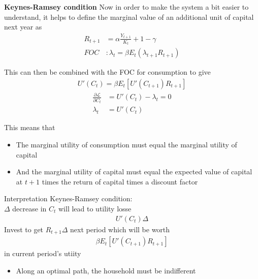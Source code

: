 \documentclass{beamer}
\begin{document}
\begin{frame}
 \textbf{Keynes-Ramsey condition}
 Now in order to make the system a bit easier to understand, it helps to define the marginal value of an additional unit of capital next year as
\begin{align}
  R_{t+1}&= \alpha \frac{Y_{t+1}}{K_t}+1-\gamma\\
  FOC &: \lambda_t=\beta E_t(\lambda_{t+1}R_{t+1})  
\end{align}

This can then be combined with the FOC for consumption to give
\begin{align}
  U'(C_t)= \beta E_t[U'(C_{t+1})R_{t+1}]
\end{align}
\begin{align}
  \frac{\partial \mathcal{L}}{\partial C_t} &= U'(C_t)-\lambda_t=0\\
  \lambda_t &= U'(C_t)
\end{align}
\end{frame}

\begin{frame}
  This means that
\begin{itemize}
  \item The marginal utility of consumption must equal the marginal utility of capital
  \item And the marginal utility of capital must equal the expected value of capital at $t+1$ times the return of capital times a discount factor
\end{itemize}
\end{frame}

\begin{frame}
 Interpretation Keynes-Ramsey condition:\\
 $\Delta$ decrease in $C_t$ will lead to utility losse
 \begin{align*}
    U'(C_t)\Delta
  \end{align*} 
  Invest to get $R_{t+1}\Delta$ next period which will be worth
 \begin{align*}
  \beta E_t[U'(C_{t+1})R_{t+1}]
 \end{align*}
 in current period's utiity
 \begin{itemize}
   \item Along an optimal path, the household must be indifferent 
 \end{itemize}
\end{frame}
\end{document}
